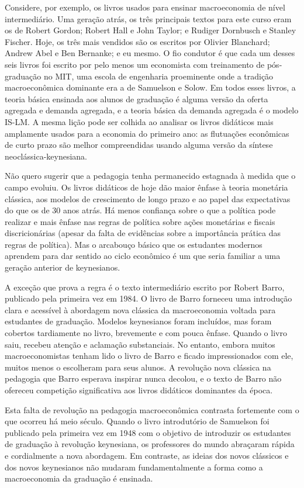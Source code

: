 \documentclass[12pt]{article}
\begin{document}
Considere, por exemplo, os livros usados para ensinar macroeconomia de nível intermediário. Uma geração atrás, os três principais textos para este curso eram os de Robert Gordon; Robert Hall e John Taylor; e Rudiger Dornbusch e Stanley Fischer. Hoje, os três mais vendidos são os escritos por Olivier Blanchard; Andrew Abel e Ben Bernanke; e eu mesmo. O fio condutor é que cada um desses seis livros foi escrito por pelo menos um economista com treinamento de pós-graduação no MIT, uma escola de engenharia proeminente onde a tradição macroeconômica dominante era a de Samuelson e Solow. Em todos esses livros, a teoria básica ensinada aos alunos de graduação é alguma versão da oferta agregada e demanda agregada, e a teoria básica da demanda agregada é o modelo IS-LM. A mesma lição pode ser colhida ao analisar os livros didáticos mais amplamente usados para a economia do primeiro ano: as flutuações econômicas de curto prazo são melhor compreendidas usando alguma versão da síntese neoclássica-keynesiana.

Não quero sugerir que a pedagogia tenha permanecido estagnada à medida que o campo evoluiu. Os livros didáticos de hoje dão maior ênfase à teoria monetária clássica, aos modelos de crescimento de longo prazo e ao papel das expectativas do que os de 30 anos atrás. Há menos confiança sobre o que a política pode realizar e mais ênfase nas regras de política sobre ações monetárias e fiscais discricionárias (apesar da falta de evidências sobre a importância prática das regras de política). Mas o arcabouço básico que os estudantes modernos aprendem para dar sentido ao ciclo econômico é um que seria familiar a uma geração anterior de keynesianos.

A exceção que prova a regra é o texto intermediário escrito por Robert Barro, publicado pela primeira vez em 1984. O livro de Barro forneceu uma introdução clara e acessível à abordagem nova clássica da macroeconomia voltada para estudantes de graduação. Modelos keynesianos foram incluídos, mas foram cobertos tardiamente no livro, brevemente e com pouca ênfase. Quando o livro saiu, recebeu atenção e aclamação substanciais. No entanto, embora muitos macroeconomistas tenham lido o livro de Barro e ficado impressionados com ele, muitos menos o escolheram para seus alunos. A revolução nova clássica na pedagogia que Barro esperava inspirar nunca decolou, e o texto de Barro não ofereceu competição significativa aos livros didáticos dominantes da época.

Esta falta de revolução na pedagogia macroeconômica contrasta fortemente com o que ocorreu há meio século. Quando o livro introdutório de Samuelson foi publicado pela primeira vez em 1948 com o objetivo de introduzir os estudantes de graduação à revolução keynesiana, os professores do mundo abraçaram rápida e cordialmente a nova abordagem. Em contraste, as ideias dos novos clássicos e dos novos keynesianos não mudaram fundamentalmente a forma como a macroeconomia da graduação é ensinada.
\end{document}

